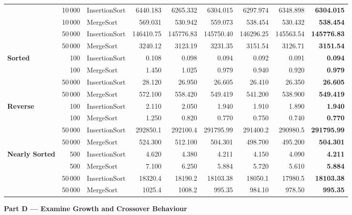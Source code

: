 \documentclass[11pt]{article}
\begin{document}
\begin{center}
\begin{tabular*}{\textwidth}{@{\extracolsep{\fill}}l r l rrrrr r}
& 10\,000 & InsertionSort & 6440.183 & 6265.332 & 6304.015 & 6297.974 & 6348.898 & \textbf{6304.015} \\
& 10\,000 & MergeSort & 569.031 & 530.942 & 559.073 & 538.454 & 530.432 & \textbf{538.454} \\
& 50\,000 & InsertionSort & 146410.75 & 145776.83 & 145750.40 & 146296.25 & 145563.54 & \textbf{145776.83} \\
& 50\,000 & MergeSort & 3240.12 & 3123.19 & 3231.35 & 3151.54 & 3126.71 & \textbf{3151.54} \\
\midrule
\textbf{Sorted} & 100 & InsertionSort & 0.108 & 0.098 & 0.094 & 0.092 & 0.091 & \textbf{0.094} \\
& 100 & MergeSort & 1.450 & 1.025 & 0.979 & 0.940 & 0.920 & \textbf{0.979} \\
& 50\,000 & InsertionSort & 28.120 & 26.950 & 26.605 & 26.410 & 26.350 & \textbf{26.605} \\
& 50\,000 & MergeSort & 572.100 & 558.420 & 549.419 & 541.200 & 538.900 & \textbf{549.419} \\
\midrule
\textbf{Reverse} & 100 & InsertionSort & 2.110 & 2.050 & 1.940 & 1.910 & 1.890 & \textbf{1.940} \\
& 100 & MergeSort & 1.250 & 0.820 & 0.770 & 0.750 & 0.740 & \textbf{0.770} \\
& 50\,000 & InsertionSort & 292850.1 & 292100.4 & 291795.99 & 291400.2 & 290980.5 & \textbf{291795.99} \\
& 50\,000 & MergeSort & 524.300 & 512.100 & 504.301 & 498.700 & 495.200 & \textbf{504.301} \\
\midrule
\textbf{Nearly Sorted} & 500 & InsertionSort & 4.620 & 4.380 & 4.211 & 4.150 & 4.090 & \textbf{4.211} \\
& 500 & MergeSort & 7.100 & 6.250 & 5.884 & 5.720 & 5.610 & \textbf{5.884} \\
& 50\,000 & InsertionSort & 18320.4 & 18190.2 & 18103.38 & 18050.1 & 17980.5 & \textbf{18103.38} \\
& 50\,000 & MergeSort & 1025.4 & 1008.2 & 995.35 & 984.10 & 978.50 & \textbf{995.35} \\
\bottomrule
\end{tabular*}
\end{center}

\newpage

{\centering\fontsize{15}{18}\selectfont\textbf{Part D --- Examine Growth and Crossover Behaviour}\par}
\vspace{0.8em}
\end{document}
